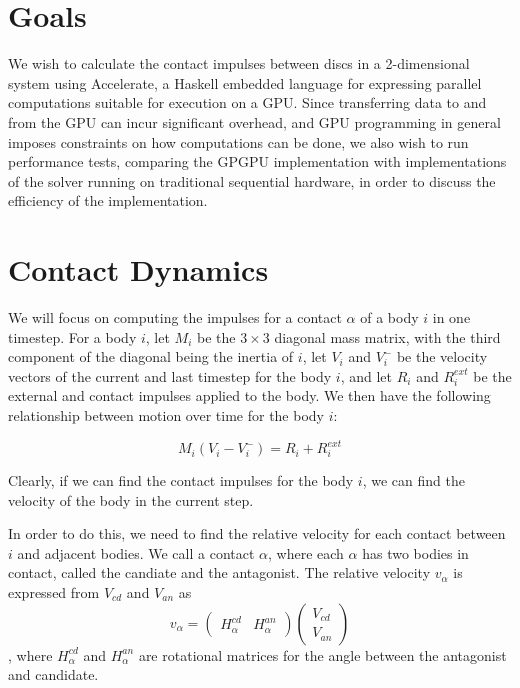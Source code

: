 \documentclass[runningheads,a4paper]{llncs}
\begin{document}
\section{Goals}

We wish to calculate the contact impulses between discs in a 2-dimensional
system using Accelerate, a Haskell embedded language for expressing parallel
computations suitable for execution on a GPU. Since transferring data to and
from the GPU can incur significant overhead, and GPU programming in general
imposes constraints on how computations can be done, we also wish to run
performance tests, comparing the GPGPU implementation with implementations of
the solver running on traditional sequential hardware, in order to discuss the
efficiency of the implementation.

\section{Contact Dynamics}

We will focus on computing the impulses for a contact $\alpha$ of a body $i$ in
one timestep. For a body $i$, let $M_i$ be the $3 \times 3$ diagonal mass
matrix, with the third component of the diagonal being the inertia of $i$, let
$V_i$ and $V_i^-$ be the velocity vectors of the current and last timestep for
the body $i$, and let $R_i$ and $R_i^{ext}$ be the external and contact impulses
applied to the body. We then have the following relationship between motion
over time for the body $i$:

\begin{equation}
  M_i(V_i - V_i^-) = R_i + R_i^{ext}
\end{equation}

Clearly, if we can find the contact impulses for the body $i$, we can find the
velocity of the body in the current step.

In order to do this, we need to find the relative velocity for each contact
between $i$ and adjacent bodies. We call a contact $\alpha$, where each
$\alpha$ has two bodies in contact, called the candiate and the antagonist. The
relative velocity $v_\alpha$ is expressed from $V_{cd}$ and $V_{an}$ as
\begin{equation}
  v_\alpha =
  \begin{pmatrix}
    H_\alpha^{cd} &
    H_\alpha^{an}
  \end{pmatrix}
  \begin{pmatrix}
    V_{cd} \\
    V_{an}
  \end{pmatrix}
\end{equation},
where $H_\alpha^{cd}$ and $H_\alpha^{an}$ are rotational matrices for the angle
between the antagonist and candidate.
\end{document}
